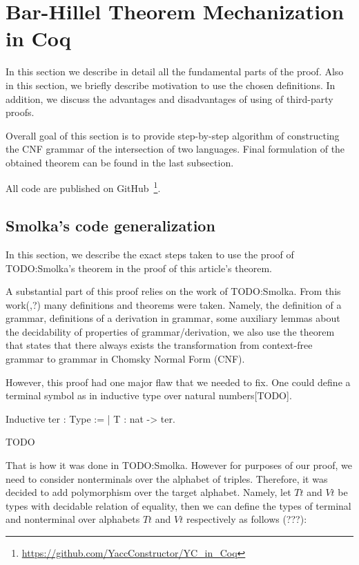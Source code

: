 \section{Bar-Hillel Theorem Mechanization in Coq}


In this section we describe in detail all the fundamental parts of the proof. Also in this section, we briefly describe motivation to use the chosen definitions. In addition, we discuss the advantages and disadvantages of using of third-party proofs. 

Overall goal of this section is to provide step-by-step algorithm of constructing the CNF grammar of the intersection of two languages. Final formulation of the obtained theorem can be found in the last subsection. 

All code are published on GitHub~\footnote{\url{https://github.com/YaccConstructor/YC\_in\_Coq}}.
   
\subsection{ Smolka's code generalization}

In this section, we describe the exact steps taken to use the proof of TODO:Smolka's theorem in the proof of this article's theorem.

A substantial part of this proof relies on the work of TODO:Smolka. From this work(,?) many definitions and theorems were taken. Namely, the definition of a grammar, definitions of a derivation in grammar, some auxiliary lemmas about the decidability of properties of grammar/derivation, we also use the theorem that states that there always exists the transformation from context-free grammar to grammar in Chomsky Normal Form (CNF).

However, this proof had one major flaw that we needed to fix. One could define a terminal symbol as in inductive type over natural numbers[TODO].

\begin{listing}[h]
	\begin{pyglist}[language=coq, numbers=none, numbersep=5pt]
  Inductive ter : Type := | T : nat -> ter.
	\end{pyglist}
	\caption{TODO}
	\label{lst:verbments1}
\end{listing}

That is how it was done in TODO:Smolka. However for purposes of our proof, we need to consider nonterminals over the alphabet of triples. Therefore, it was decided to add polymorphism over the target alphabet. Namely, let $Tt$ and $Vt$ be types with decidable relation of equality, then we can define the types of terminal and nonterminal over alphabets $Tt$ and $Vt$ respectively as follows (???):

